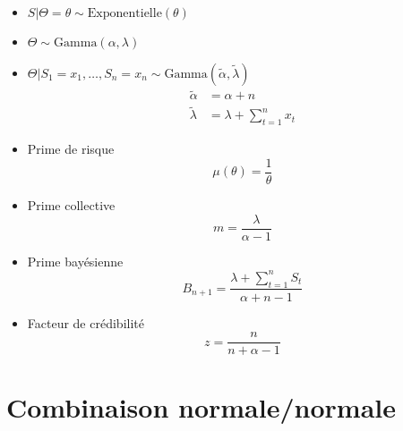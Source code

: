 \begin{itemize}
\item $S|\Theta = \theta \sim \text{Exponentielle}(\theta)$
\item $\Theta \sim \text{Gamma}(\alpha, \lambda)$
\item $\Theta|S_1 = x_1, \dots, S_n = x_n \sim
  \text{Gamma}(\tilde{\alpha}, \tilde{\lambda})$
  \begin{align*}
    \tilde{\alpha} &= \alpha + n \\
    \tilde{\lambda} &= \lambda + \sum_{t = 1}^n x_t
  \end{align*}
\item Prime de risque
  \begin{equation*}
    \mu(\theta) = \frac{1}{\theta}
  \end{equation*}
\item Prime collective
  \begin{equation*}
    m = \frac{\lambda}{\alpha - 1}
  \end{equation*}
\item Prime bayésienne
  \begin{equation*}
    B_{n + 1} = \frac{\lambda + \sum_{t = 1}^n S_t}{\alpha + n - 1}
  \end{equation*}
\item Facteur de crédibilité
  \begin{equation*}
    z = \frac{n}{n + \alpha - 1}
  \end{equation*}
\end{itemize}


\section{Combinaison normale/normale}

